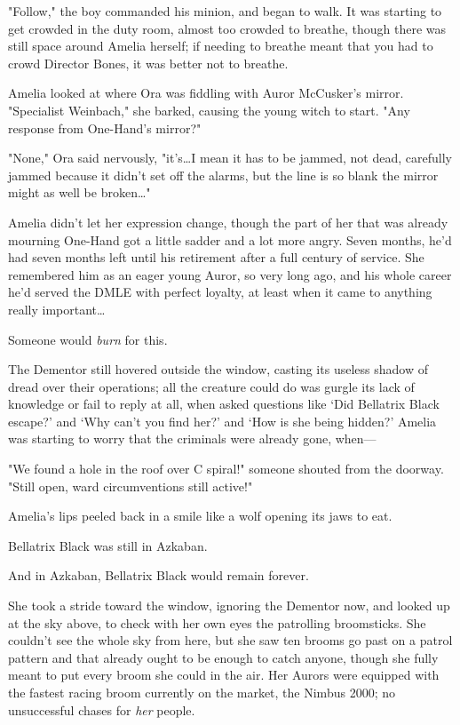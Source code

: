 "Follow," the boy commanded his minion, and began to walk.
\later
It was starting to get crowded in the duty room, almost too crowded to breathe,
though there was still space around Amelia herself; if needing to breathe meant
that you had to crowd Director Bones, it was better not to breathe.

Amelia looked at where Ora was fiddling with Auror McCusker's mirror.
"Specialist Weinbach," she barked, causing the young witch to start. "Any
response from One-Hand's mirror?"

"None," Ora said nervously, "it's…I mean it has to be jammed, not dead,
carefully jammed because it didn't set off the alarms, but the line is so blank
the mirror might as well be broken…"

Amelia didn't let her expression change, though the part of her that was
already mourning One-Hand got a little sadder and a lot more angry. Seven
months, he'd had seven months left until his retirement after a full century of
service. She remembered him as an eager young Auror, so very long ago, and his
whole career he'd served the DMLE with perfect loyalty, at least when it came
to anything really important…

Someone would \emph{burn} for this.

The Dementor still hovered outside the window, casting its useless shadow of
dread over their operations; all the creature could do was gurgle its lack of
knowledge or fail to reply at all, when asked questions like `Did Bellatrix
Black escape?' and `Why can't you find her?' and `How is she being hidden?'
Amelia was starting to worry that the criminals were already gone, when—

"We found a hole in the roof over C spiral!" someone shouted from the doorway.
"Still open, ward circumventions still active!"

Amelia's lips peeled back in a smile like a wolf opening its jaws to eat.

Bellatrix Black was still in Azkaban.

And in Azkaban, Bellatrix Black would remain forever.

She took a stride toward the window, ignoring the Dementor now, and looked up
at the sky above, to check with her own eyes the patrolling broomsticks. She
couldn't see the whole sky from here, but she saw ten brooms go past on a
patrol pattern and that already ought to be enough to catch anyone, though she
fully meant to put every broom she could in the air. Her Aurors were equipped
with the fastest racing broom currently on the market, the Nimbus 2000; no
unsuccessful chases for \emph{her} people.

